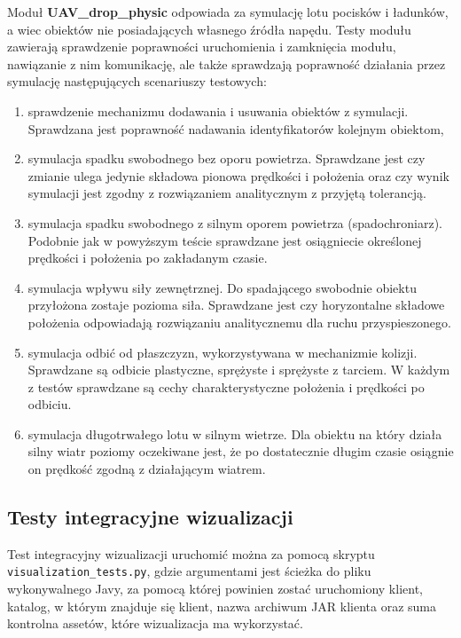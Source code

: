 Moduł \textbf{UAV\_drop\_physic} odpowiada za symulację lotu pocisków i ładunków, a wiec obiektów nie posiadających własnego źródła napędu. Testy modułu zawierają sprawdzenie poprawności uruchomienia i zamknięcia modułu, nawiązanie z nim komunikację, ale także sprawdzają poprawność działania przez symulację następujących scenariuszy testowych:

\begin{enumerate}
\item sprawdzenie mechanizmu dodawania i usuwania obiektów z symulacji. Sprawdzana jest poprawność nadawania identyfikatorów kolejnym obiektom,
\item symulacja spadku swobodnego bez oporu powietrza. Sprawdzane jest czy zmianie ulega jedynie składowa pionowa prędkości i położenia oraz czy wynik symulacji jest zgodny z rozwiązaniem analitycznym z przyjętą tolerancją.
\item symulacja spadku swobodnego z silnym oporem powietrza (spadochroniarz). Podobnie jak w powyższym teście sprawdzane jest osiągniecie określonej prędkości i położenia po zakładanym czasie.
\item symulacja wpływu siły zewnętrznej. Do spadającego swobodnie obiektu przyłożona zostaje pozioma siła. Sprawdzane jest czy horyzontalne składowe położenia odpowiadają rozwiązaniu analitycznemu dla ruchu przyspieszonego.
\item symulacja odbić od płaszczyzn, wykorzystywana w mechanizmie kolizji. Sprawdzane są odbicie plastyczne, sprężyste i sprężyste z tarciem. W każdym z testów sprawdzane są cechy charakterystyczne położenia i prędkości po odbiciu.
\item symulacja długotrwałego lotu w silnym wietrze. Dla obiektu na który działa silny wiatr poziomy oczekiwane jest, że po dostatecznie długim czasie osiągnie on prędkość zgodną z działającym wiatrem. 
\end{enumerate}
\subsection{Testy integracyjne wizualizacji}

Test integracyjny wizualizacji uruchomić można za pomocą skryptu \\ \texttt{visualization\_tests.py}, gdzie argumentami jest ścieżka do pliku wykonywalnego Javy, za pomocą której powinien zostać uruchomiony klient, katalog, w którym znajduje się klient, nazwa archiwum JAR klienta oraz suma kontrolna assetów, które wizualizacja ma wykorzystać. \\


